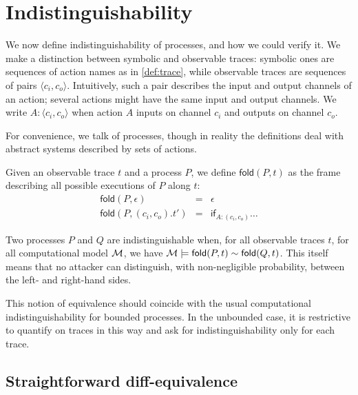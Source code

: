 \section{Indistinguishability}

\newcommand{\pair}[1]{\langle #1 \rangle}

We now define indistinguishability of processes, and how we could verify it.
We make a distinction between symbolic and observable traces:
symbolic ones are sequences of action names as in \cref{def:trace},
while observable traces are sequences of pairs $\pair{c_i,c_o}$.
Intuitively, such a pair describes the input and output channels of an 
action; several actions might have the same input and output channels.
We write $A : \pair{c_i,c_o}$ when action $A$ inputs on channel $c_i$ and
outputs on channel $c_o$.

For convenience, we talk of processes, though in reality the definitions
deal with abstract systems described by sets of actions.

\newcommand{\fold}{\mathsf{fold}}

\begin{definition}
  Given an observable trace $t$ and a process $P$,
  we define $\fold(P,t)$ as the frame describing all possible
  executions of $P$ along $t$:
  \begin{eqnarray*}
    \fold(P,\epsilon) &=& \epsilon \\
    \fold(P,(c_i,c_o).t') &=&
      \mathsf{if}_{A:(c_i,c_o)}
      \ldots
  \end{eqnarray*}
\end{definition}

\begin{definition}
  Two processes $P$ and $Q$ are indistinguishable when,
  for all observable traces $t$,
  for all computational model $\mathcal{M}$,
  we have
  $\M \models \fold(P,t) \sim \fold(Q,t)$.
  This itself means that no attacker can distinguish,
  with non-negligible probability, between the left- and right-hand sides.
\end{definition}

This notion of equivalence should coincide with the usual computational
indistinguishability for bounded processes. In the unbounded case, it
is restrictive to quantify on traces in this way
and ask for indistinguishability only for each trace.

\subsection{Straightforward diff-equivalence}

